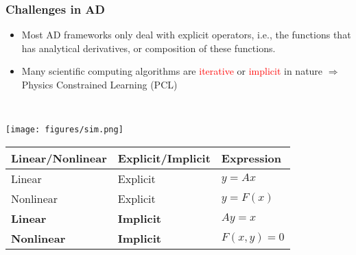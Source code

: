 \documentclass[usenames,dvipsnames]{beamer}
\begin{document}
\begin{frame}
	
	
	\frametitle{Challenges in AD}
	
	
	\begin{minipage}[t]{0.49\textwidth}
		\vspace{-3cm}
		\begin{itemize}
			\item Most AD frameworks only deal with explicit operators, i.e., the functions that has analytical derivatives, or composition of these functions. 
			\item Many scientific computing algorithms are \textcolor{red}{iterative} or \textcolor{red}{implicit} in nature $\Rightarrow$ Physics Constrained Learning (PCL)
		\end{itemize}
	\end{minipage}~
	\begin{minipage}[t]{0.49\textwidth}
		\texttt{[image: figures/sim.png]}
	\end{minipage}
	
	\begin{table}[]
		\begin{tabular}{@{}lll@{}}
			\toprule
			Linear/Nonlinear & Explicit/Implicit & Expression   \\ \midrule
			Linear           & Explicit          & $y=Ax$       \\
			Nonlinear        & Explicit          & $y = F(x)$   \\
			\textbf{Linear}           & \textbf{Implicit}          & $Ay = x$     \\
			\textbf{Nonlinear}        & \textbf{Implicit}          & $F(x,y) = 0$ \\ \bottomrule
		\end{tabular}
	\end{table}
\end{frame}
\end{document}
